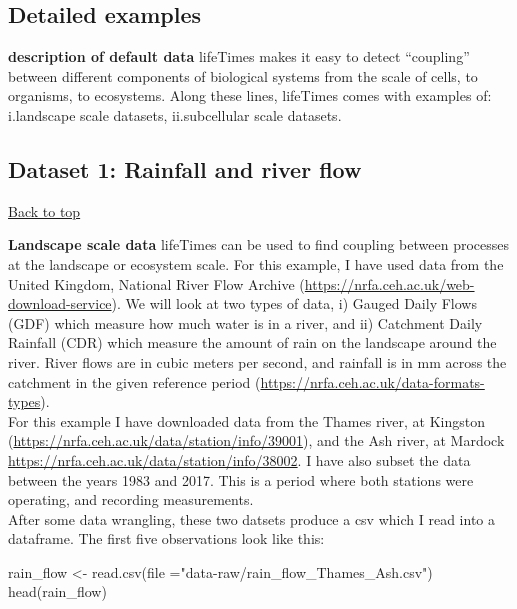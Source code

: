 \documentclass[
]{article}
\newenvironment{Shaded}{\begin{snugshade}}{\end{snugshade}}
\newcommand{\AttributeTok}[1]{\textcolor[rgb]{0.77,0.63,0.00}{#1}}
\newcommand{\FunctionTok}[1]{\textcolor[rgb]{0.00,0.00,0.00}{#1}}
\newcommand{\NormalTok}[1]{#1}
\newcommand{\OtherTok}[1]{\textcolor[rgb]{0.56,0.35,0.01}{#1}}
\newcommand{\StringTok}[1]{\textcolor[rgb]{0.31,0.60,0.02}{#1}}
\begin{document}
\hypertarget{detailed-examples}{%
\subsection{\texorpdfstring{\textbf{Detailed
examples}}{Detailed examples}}\label{detailed-examples}}

\textbf{description of default data} lifeTimes makes it easy to detect
``coupling'' between different components of biological systems from the
scale of cells, to organisms, to ecosystems. Along these lines,
lifeTimes comes with examples of:\\
i.landscape scale datasets, ii.subcellular scale datasets.

\hypertarget{dataset-1-rainfall-and-river-flow}{%
\subsection{\texorpdfstring{\textbf{Dataset 1: Rainfall and river
flow}}{Dataset 1: Rainfall and river flow}}\label{dataset-1-rainfall-and-river-flow}}

\protect\hyperlink{}{Back to top}

\textbf{Landscape scale data} lifeTimes can be used to find coupling
between processes at the landscape or ecosystem scale. For this example,
I have used data from the United Kingdom, National River Flow Archive
(\url{https://nrfa.ceh.ac.uk/web-download-service}). We will look at two
types of data, i) Gauged Daily Flows (GDF) which measure how much water
is in a river, and ii) Catchment Daily Rainfall (CDR) which measure the
amount of rain on the landscape around the river. River flows are in
cubic meters per second, and rainfall is in mm across the catchment in
the given reference period
(\url{https://nrfa.ceh.ac.uk/data-formats-types}).\\

For this example I have downloaded data from the Thames river, at
Kingston (\url{https://nrfa.ceh.ac.uk/data/station/info/39001}), and the
Ash river, at Mardock
\url{https://nrfa.ceh.ac.uk/data/station/info/38002}. I have also subset
the data between the years 1983 and 2017. This is a period where both
stations were operating, and recording measurements.\\

After some data wrangling, these two datsets produce a csv which I read
into a dataframe. The first five observations look like this:

\begin{Shaded}
\begin{Highlighting}[]
\NormalTok{rain\_flow }\OtherTok{\textless{}{-}} \FunctionTok{read.csv}\NormalTok{(}\AttributeTok{file =}\StringTok{"data{-}raw/rain\_flow\_Thames\_Ash.csv"}\NormalTok{)}
\FunctionTok{head}\NormalTok{(rain\_flow)}
\end{Highlighting}
\end{Shaded}
\end{document}
